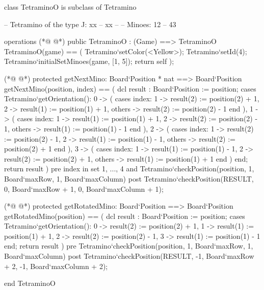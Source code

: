 \begin{vdmpp}[breaklines=true]
class TetraminoO is subclass of Tetramino
  
 -- Tetramino of the type J: xx
 --         xx
 --  
 -- Minoes:       12
 --         43
 

 operations
(*@
\label{TetraminoO:11}
@*)
  public TetraminoO : (Game) ==> TetraminoO
  TetraminoO(game) == (
   Tetramino`setColor(<Yellow>);
   Tetramino`setId(4);
   Tetramino`initialSetMinoes(game, [1, 5]);
   return self
  );

(*@
\label{getNextMino:19}
@*)
  protected getNextMino: Board`Position * nat ==> Board`Position
  getNextMino(position, index) == (
   dcl result : Board`Position := position;
   cases Tetramino`getOrientation():
    0 -> (
     cases index:
      1 -> result(2) := position(2) + 1,
      2 -> result(1) := position(1) + 1,
      others -> result(2) := position(2) - 1
     end
    ),
    1 -> (
     cases index:
      1 -> result(1) := position(1) + 1,
      2 -> result(2) := position(2) - 1,
      others -> result(1) := position(1) - 1
     end
    ),
    2 -> (
     cases index:
      1 -> result(2) := position(2) - 1,
      2 -> result(1) := position(1) - 1,
      others -> result(2) := position(2) + 1
     end
    ),
    3 -> (
     cases index:
      1 -> result(1) := position(1) - 1,
      2 -> result(2) := position(2) + 1,
      others -> result(1) := position(1) + 1
     end
    )
   end;
   return result
  )
  pre index in set {1, ..., 4} 
   and Tetramino`checkPosition(position, 1, Board`maxRow, 1, Board`maxColumn)
  post Tetramino`checkPosition(RESULT, 0, Board`maxRow + 1, 0, Board`maxColumn + 1);
   
(*@
\label{getRotatedMino:58}
@*)
  protected getRotatedMino: Board`Position ==> Board`Position
  getRotatedMino(position) == (
   dcl result : Board`Position := position;
   cases Tetramino`getOrientation():
    0 -> result(2) := position(2) + 1,
    1 -> result(1) := position(1) + 1,
    2 -> result(2) := position(2) - 1,
    3 -> result(1) := position(1) - 1
   end;
   return result
  )
  pre Tetramino`checkPosition(position, 1, Board`maxRow, 1, Board`maxColumn)
  post Tetramino`checkPosition(RESULT, -1, Board`maxRow + 2, -1, Board`maxColumn + 2);

end TetraminoO
\end{vdmpp}
